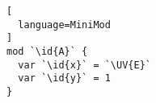 \begin{lstlisting}[
  language=MiniMod
]
mod `\id{A}` {
  var `\id{x}` = `\UV{E}`
  var `\id{y}` = 1
}
\end{lstlisting}
\hspace{1em}